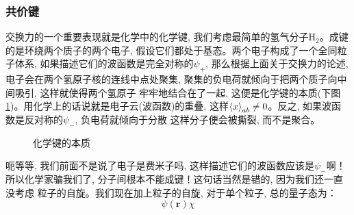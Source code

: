 \documentclass[a4paper,zihao=-4,linespread=1]{ctexrep}
\begin{document}
    \subsubsection*{共价键}
    交换力的一个重要表现就是化学中的化学键, 我们考虑最简单的氢气分子$\mathrm{H}_2$。成键的是环绕两个质子的两个电子, 假设它们都处于基态。两个电子构成了一个全同粒子体系,
    如果描述它们的波函数是完全对称的$\psi_+$, 那么根据上面关于交换力的论述, 电子会在两个氢原子核的连线中点处聚集, 聚集的负电荷就倾向于把两个质子向中间吸引, 这样就使得两个氢原子
    牢牢地结合在了一起, 这便是化学键的本质(下图\ref{fig:5.1})。用化学上的话说就是电子云(波函数)的重叠, 这样$\braket{x}_{ab}\neq 0$。反之, 如果波函数是反对称的$\psi_-$, 负电荷就倾向于分散
    这样分子便会被撕裂, 而不是聚合。
    \begin{figure}[htbp]
        \centering
        \caption{化学键的本质}   %
        \label{fig:5.1}  %
    \end{figure}

    呃等等, 我们前面不是说了电子是费米子吗, 这样描述它们的波函数应该是$\psi_-$啊！所以化学家骗我们了, 分子间根本不能成键！这句话当然是错的, 因为我们还一直没考虑
    粒子的自旋。我们现在加上粒子的自旋, 对于单个粒子, 总的量子态为：
    \begin{equation}
        \psi(\mathbf{r})\chi
    \end{equation}
\end{document}
